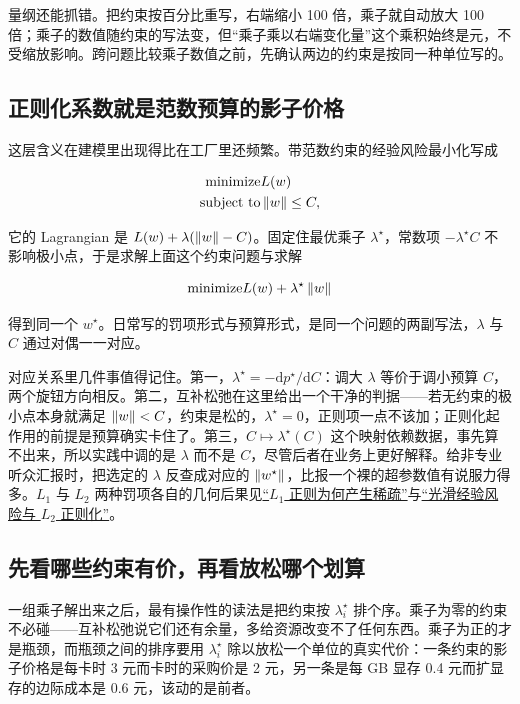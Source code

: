 量纲还能抓错。把约束按百分比重写，右端缩小 100 倍，乘子就自动放大 100 倍；乘子的数值随约束的写法变，但``乘子乘以右端变化量''这个乘积始终是元，不受缩放影响。跨问题比较乘子数值之前，先确认两边的约束是按同一种单位写的。

\subsection{正则化系数就是范数预算的影子价格}

这层含义在建模里出现得比在工厂里还频繁。带范数约束的经验风险最小化写成

\[
\begin{aligned}
\text{minimize}\space&L(w)\\
\text{subject to}\space&\left\lVert w\right\rVert\le C,
\end{aligned}
\]

它的 Lagrangian 是 \(L(w)+\lambda(\left\lVert w\right\rVert-C)\)。固定住最优乘子 \(\lambda^\star\)，常数项 \(-\lambda^\star C\) 不影响极小点，于是求解上面这个约束问题与求解

\[
\text{minimize}\space L(w)+\lambda^\star\left\lVert w\right\rVert
\]

得到同一个 \(w^\star\)。日常写的罚项形式与预算形式，是同一个问题的两副写法，\(\lambda\) 与 \(C\) 通过对偶一一对应。

对应关系里几件事值得记住。第一，\(\lambda^\star=-\mathrm{d}p^\star/\mathrm{d}C\)：调大 \(\lambda\) 等价于调小预算 \(C\)，两个旋钮方向相反。第二，互补松弛在这里给出一个干净的判据——若无约束的极小点本身就满足 \(\left\lVert w\right\rVert<C\)，约束是松的，\(\lambda^\star=0\)，正则项一点不该加；正则化起作用的前提是预算确实卡住了。第三，\(C\mapsto\lambda^\star(C)\) 这个映射依赖数据，事先算不出来，所以实践中调的是 \(\lambda\) 而不是 \(C\)，尽管后者在业务上更好解释。给非专业听众汇报时，把选定的 \(\lambda\) 反查成对应的 \(\left\lVert w^\star\right\rVert\)，比报一个裸的超参数值有说服力得多。\(L_1\) 与 \(L_2\) 两种罚项各自的几何后果见\hyperref[sec:09-Convex-Optimization/07-Applications/02]{``\(L_1\) 正则为何产生稀疏''}与\hyperref[sec:09-Convex-Optimization/07-Applications/01]{``光滑经验风险与 \(L_2\) 正则化''}。

\subsection{先看哪些约束有价，再看放松哪个划算}

一组乘子解出来之后，最有操作性的读法是把约束按 \(\lambda_i^\star\) 排个序。乘子为零的约束不必碰——互补松弛说它们还有余量，多给资源改变不了任何东西。乘子为正的才是瓶颈，而瓶颈之间的排序要用 \(\lambda_i^\star\) 除以放松一个单位的真实代价：一条约束的影子价格是每卡时 3 元而卡时的采购价是 2 元，另一条是每 GB 显存 0.4 元而扩显存的边际成本是 0.6 元，该动的是前者。

